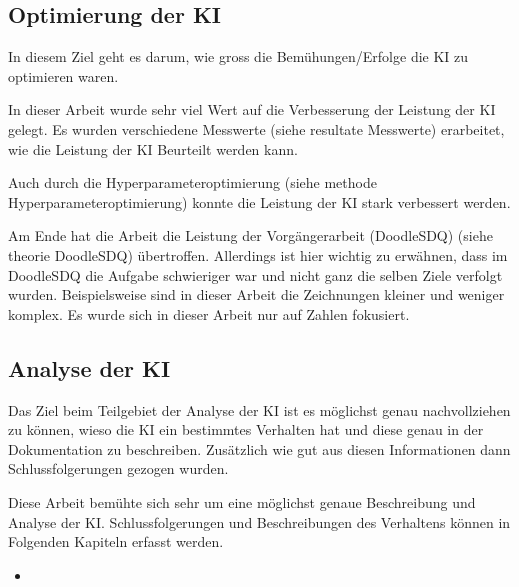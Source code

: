 

\subsection*{Optimierung der KI}
In diesem Ziel geht es darum, wie gross die Bemühungen/Erfolge die KI zu
optimieren waren.

In dieser Arbeit wurde sehr viel Wert auf die Verbesserung der Leistung der KI
gelegt. Es wurden verschiedene Messwerte (siehe resultate Messwerte) erarbeitet,  %
wie die Leistung der KI Beurteilt werden kann.

Auch durch die Hyperparameteroptimierung (siehe methode Hyperparameteroptimierung) %
konnte die Leistung der KI stark verbessert werden.

Am Ende hat die Arbeit die Leistung der Vorgängerarbeit (DoodleSDQ) (siehe theorie  %
DoodleSDQ) übertroffen. Allerdings ist hier wichtig zu erwähnen, dass im
DoodleSDQ die Aufgabe schwieriger war und nicht ganz die selben Ziele verfolgt
wurden. Beispielsweise sind in dieser Arbeit die Zeichnungen kleiner und weniger
komplex. Es wurde sich in dieser Arbeit nur auf Zahlen fokusiert.


\subsection*{Analyse der KI}
Das Ziel beim Teilgebiet der Analyse der KI ist es möglichst genau
nachvollziehen zu können, wieso die KI ein bestimmtes Verhalten hat und diese
genau in der Dokumentation zu beschreiben. Zusätzlich wie gut aus diesen
Informationen dann Schlussfolgerungen gezogen wurden.

Diese Arbeit bemühte sich sehr um eine möglichst genaue Beschreibung und Analyse
der KI. Schlussfolgerungen und Beschreibungen des Verhaltens können in Folgenden Kapiteln erfasst werden.

\begin{itemize}
    \item 
\end{itemize}
